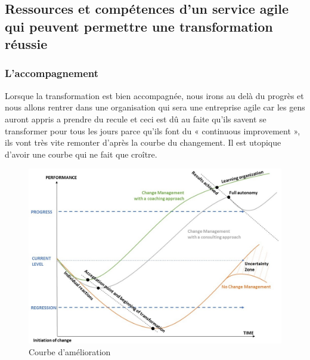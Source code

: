 \documentclass[12pt,a4paper]{article}
\begin{document}
\subsection{Ressources et compétences d'un service agile qui peuvent permettre une transformation réussie}

\subsubsection{L'accompagnement}

Lorsque la transformation est bien accompagnée, nous irons au delà du progrès et nous allons rentrer dans une organisation qui sera une entreprise agile car les gens auront appris a prendre du recule et ceci est dû au faite qu'ils savent se transformer pour tous les jours parce qu'ils font du « continuous improvement », ils vont très vite remonter d'après la courbe du changement. Il est utopique d'avoir une courbe qui ne fait que croître.\\
\newpage
\begin{figure}[h!]
\centering
\includegraphics[scale=0.55]{"Diapositive1"}
\caption{Courbe d'amélioration}
\label{fig:courbe}
\end{figure}
\end{document}
